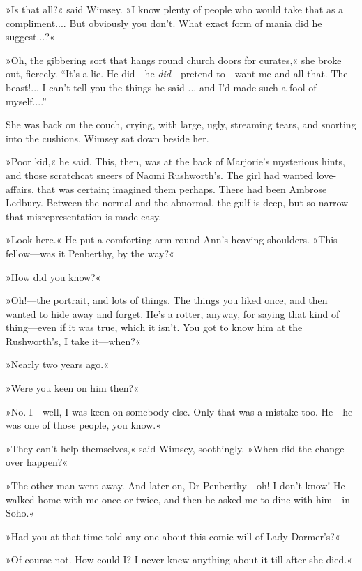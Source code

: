 »Is that all?« said Wimsey. »I know plenty of people who would take that as a compliment.... But obviously you don't. What exact form of mania did he suggest...?«

»Oh, the gibbering sort that hangs round church doors for curates,« she broke out, fiercely. \enquote{It's a lie. He did\allowbreak---\allowbreak he \textit{did}---pretend to\allowbreak---\allowbreak want me and all that. The beast!... I can't tell you the things he said ... and I'd made such a fool of myself....}

She was back on the couch, crying, with large, ugly, streaming tears, and snorting into the cushions. Wimsey sat down beside her.

»Poor kid,« he said. This, then, was at the back of Marjorie's mysterious hints, and those scratchcat sneers of Naomi Rushworth's. The girl had wanted love-affairs, that was certain; imagined them perhaps. There had been Ambrose Ledbury. Between the normal and the abnormal, the gulf is deep, but so narrow that misrepresentation is made easy.

»Look here.« He put a comforting arm round Ann's heaving shoulders. »This fellow\allowbreak---\allowbreak was it Penberthy, by the way?«

»How did you know?«

»Oh!---the portrait, and lots of things. The things you liked once, and then wanted to hide away and forget. He's a rotter, anyway, for saying that kind of thing\allowbreak---\allowbreak even if it was true, which it isn't. You got to know him at the Rushworth's, I take it\allowbreak---\allowbreak when?«

»Nearly two years ago.«

»Were you keen on him then?«

»No. I\allowbreak---\allowbreak well, I was keen on somebody else. Only that was a mistake too. He\allowbreak---\allowbreak he was one of those people, you know.«

»They can't help themselves,« said Wimsey, soothingly. »When did the change-over happen?«

»The other man went away. And later on, Dr Penberthy\allowbreak---\allowbreak oh! I don't know! He walked home with me once or twice, and then he asked me to dine with him\allowbreak---\allowbreak in Soho.«

»Had you at that time told any one about this comic will of Lady Dormer's?«

»Of course not. How could I? I never knew anything about it till after she died.«


